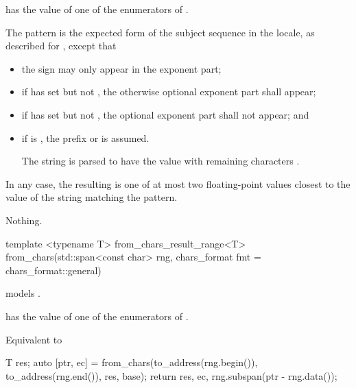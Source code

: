 \documentclass{wg21}
\begin{document}
\begin{itemdescr}
\pnum
\expects
{} has the value of
one of the enumerators of .

\pnum
\effects
The pattern is the expected form of the subject sequence
in the  locale,
as described for ,
except that
\begin{itemize}
    \item
    the sign  may only appear in the exponent part;
    \item
    if  has  set
    but not ,
    the otherwise optional exponent part shall appear;
    \item
    if  has  set
    but not ,
    the optional exponent part shall not appear; and
    \item
    if  is ,
    the prefix  or  is assumed.
    \begin{example}
        The string 
        is parsed to have the value
        with remaining characters .
    \end{example}
\end{itemize}
In any case, the resulting  is one of
at most two floating-point values
closest to the value of the string matching the pattern.

\pnum
\throws
Nothing.
\end{itemdescr}

\begin{addedblock}
\begin{itemdecl}
template <typename T>
from_chars_result_range<T> from_chars(std::span<const char> rng, chars_format fmt = chars_format::general)
\end{itemdecl}

\begin{itemdescr}
\pnum

\constraints {} models .

\expects
{} has the value of
one of the enumerators of .


\effects Equivalent to
\begin{codeblock}
    T res;
    auto [ptr, ec] = from_chars(to_address(rng.begin()), to_address(rng.end()), res, base);
    return {res, ec, rng.subspan(ptr - rng.data())};
\end{codeblock}

\end{itemdescr}

\end{addedblock}
\end{document}
